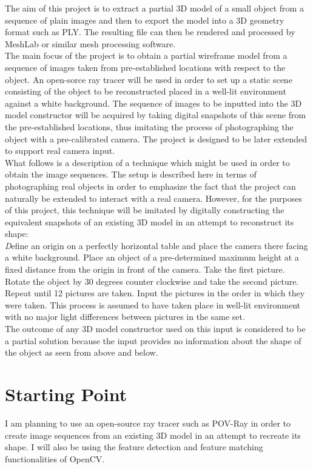 The aim of this project is to extract a partial 3D model of a small object from a sequence of plain images and then to export the model into a 3D geometry format such as PLY. The resulting file can then be rendered and processed by MeshLab or similar mesh processing software.\\
The main focus of the project is to obtain a partial wireframe model from a sequence of images taken from pre-established locations with respect to the object. An open-sorce ray tracer will be used in order to set up a static scene consisting of the object to be reconstructed placed in a well-lit environment against a white background. The sequence of images to be inputted into the 3D model constructor will be acquired by taking digital snapshots of this scene from the pre-established locations, thus imitating the process of photographing the object with a pre-calibrated camera. The project is designed to be later extended to support real camera input.\\  
What follows is a description of a technique which might be used in order to obtain the image sequences. The setup is described here in terms of photographing real objects in order to emphasize the fact that the project can naturally be extended to interact with a real camera. However, for the purposes of this project, this technique will be imitated by digitally constructing the equivalent snapshots of an existing 3D model in an attempt to reconstruct its shape:\\
{\emph Define an origin on a perfectly horizontal table and place the camera there facing a white background. Place an object of a pre-determined maximum height at a fixed distance from the origin in front of the camera. Take the first picture. Rotate the object by 30 degrees counter clockwise and take the second picture. Repeat until 12 pictures are taken. Input the pictures in the order in which they were taken. This process is assumed to have taken place in well-lit environment with no major light differences between pictures in the same set.}\\
The outcome of any 3D model constructor used on this input is considered to be a partial solution because the input provides no information about the shape of the object as seen from above and below.  


\section*{Starting Point}
I am planning to use an open-source ray tracer such as POV-Ray in order to create image sequences from an existing 3D model in an attempt to recreate its shape. I will also be using the feature detection and feature matching functionalities of OpenCV.


